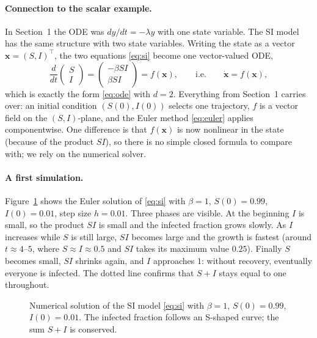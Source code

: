 \documentclass[11pt,a4paper]{article}
\newcommand{\figph}[2]{%
  \fbox{\parbox[c][3.2cm][c]{\dimexpr#1-2\fboxsep-2\fboxrule\relax}{%
    \centering\small\ttfamily [figure: #2]}}}
\begin{document}
\paragraph{Connection to the scalar example.}
In Section~1 the ODE was $dy/dt = -\lambda y$ with one state variable. The SI
model has the same structure with two state variables. Writing the state as a
vector $\mathbf{x} = (S,I)^\top$, the two equations \eqref{eq:si} become one
vector-valued ODE,
\begin{equation}
  \frac{d}{dt}\begin{pmatrix} S \\ I \end{pmatrix}
  = \begin{pmatrix} -\beta SI \\ \beta SI \end{pmatrix}
  = f(\mathbf{x}),
  \qquad \text{i.e.}\qquad \dot{\mathbf{x}} = f(\mathbf{x}),
  \label{eq:si-vector}
\end{equation}
which is exactly the form \eqref{eq:ode} with $d=2$. Everything from
Section~1 carries over: an initial condition $(S(0),I(0))$ selects one
trajectory, $f$ is a vector field on the $(S,I)$-plane, and the Euler method
\eqref{eq:euler} applies componentwise. One difference is that
$f(\mathbf{x})$ is now nonlinear in the state (because of the product $SI$), so
there is no simple closed formula to compare with; we rely on the numerical
solver.

\paragraph{A first simulation.}
Figure~\ref{fig:si-sim} shows the Euler solution of \eqref{eq:si} with
$\beta=1$, $S(0)=0.99$, $I(0)=0.01$, step size $h=0.01$. Three phases are
visible. At the beginning $I$ is small, so the product $SI$ is small and the
infected fraction grows slowly. As $I$ increases while $S$ is still large, $SI$
becomes large and the growth is fastest (around $t\approx 4$--$5$, where
$S\approx I\approx 0.5$ and $SI$ takes its maximum value $0.25$). Finally $S$
becomes small, $SI$ shrinks again, and $I$ approaches $1$: without recovery,
eventually everyone is infected. The dotted line confirms that $S+I$ stays equal
to one throughout.

\begin{figure}[h]
  \centering
  \figph{0.65\textwidth}{fig\_si\_simulation}
  \caption{Numerical solution of the SI model \eqref{eq:si} with $\beta=1$,
  $S(0)=0.99$, $I(0)=0.01$. The infected fraction follows an S-shaped curve; the
  sum $S+I$ is conserved.}
  \label{fig:si-sim}
\end{figure}
\end{document}
